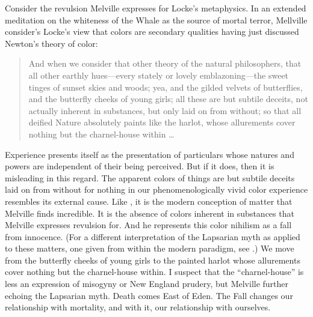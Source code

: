 Consider the revulsion Melville expresses for Locke's  metaphysics. In an extended meditation on the whiteness of the Whale as the source of mortal terror, Mellville consider's Locke's view that colors are secondary qualities having just discussed Newton's theory of color:
\begin{quote}
	And when we consider that other theory of the natural philosophers, that all other earthly hues---every stately or lovely emblazoning---the sweet tinges of sunset skies and woods; yea, and the gilded velvets of butterflies, and the butterfly cheeks of young girls; all these are but subtile deceits, not actually inherent in substances, but only laid on from without; so that all deified Nature absolutely paints like the harlot, whose allurements cover nothing but the charnel-house within \ldots\ \citep[ch. 42]{Melville:1851ms}
\end{quote}
Experience presents itself as the presentation of particulars whose natures and powers are independent of their being perceived. But if it does, then it is misleading in this regard. The apparent colors of things are but subtile deceits laid on from without for nothing in our phenomenologically vivid color experience resembles its external cause. Like \citealt[chapter one]{Bergson:1912pi}, it is the modern conception of matter that Melville finds incredible. It is the absence of colors inherent in substances that Melville expresses revulsion for. And he represents this color nihilism as a fall from innocence. (For a different interpretation of the Lapsarian myth as applied to these matters, one given from within the modern paradigm, see \citealt{Chalmers:2006kx}.) We move from the butterfly cheeks of young girls to the painted harlot whose allurements cover nothing but the charnel-house within. I suspect that the ``charnel-house'' is less an expression of misogyny or New England prudery, but Melville further echoing the Lapsarian myth. Death comes East of Eden. The Fall changes our relationship with mortality, and with it, our relationship with ourselves. 

